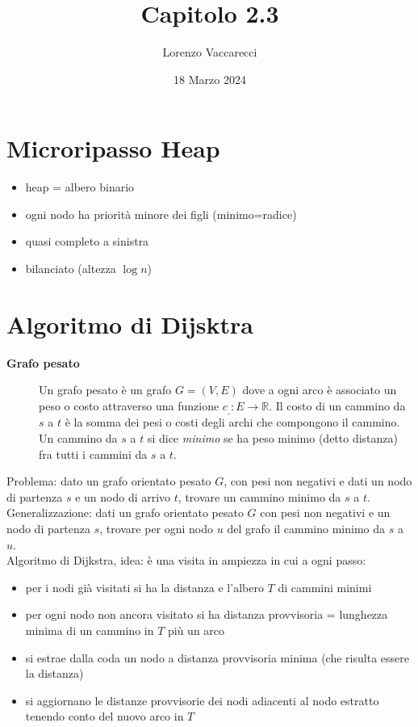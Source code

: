 \documentclass[12pt]{article}
\title{Capitolo 2.3}
\author{Lorenzo Vaccarecci}
\date{18 Marzo 2024}
\begin{document}
\maketitle
\section{Microripasso Heap}
\begin{itemize}
    \setlength\itemsep{0em}
    \item heap = albero binario
    \item ogni nodo ha priorità minore dei figli (minimo=radice)
    \item quasi completo a sinistra
    \item bilanciato (altezza $\log n$)
\end{itemize}
\section{Algoritmo di Dijsktra}
\begin{description}
    \item[\textbf{Grafo pesato}] Un grafo pesato è un grafo $G=(V,E)$ dove a ogni arco è associato un peso o costo attraverso una funzione $c_{\_}:E\rightarrow\mathbb{R}$. Il costo di un cammino da $s$ a $t$ è la somma dei pesi o costi degli archi che compongono il cammino. Un cammino da $s$ a $t$ si dice \textit{minimo} se ha peso minimo (detto distanza) fra tutti i cammini da $s$ a $t$.  
\end{description}
Problema: dato un grafo orientato pesato $G$, con pesi non negativi e dati un nodo di partenza $s$ e un nodo di arrivo $t$, trovare un cammino minimo da $s$ a $t$. Generalizzazione: dati un grafo orientato pesato $G$ con pesi non negativi e un nodo di partenza $s$, trovare per ogni nodo $u$ del grafo il cammino minimo da $s$ a $u$.\\
Algoritmo di Dijkstra, idea: è una visita in ampiezza in cui a ogni passo:
\begin{itemize}
    \setlength\itemsep{0em}
    \item per i nodi già visitati si ha la distanza e l'albero $T$ di cammini minimi
    \item per ogni nodo non ancora visitato si ha distanza provvisoria = lunghezza minima di un cammino in $T$ più un arco
    \item si estrae dalla coda un nodo a distanza provvisoria minima (che risulta essere la distanza)
    \item si aggiornano le distanze provvisorie dei nodi adiacenti al nodo estratto tenendo conto del nuovo arco in $T$
\end{itemize}\newpage
\end{document}
